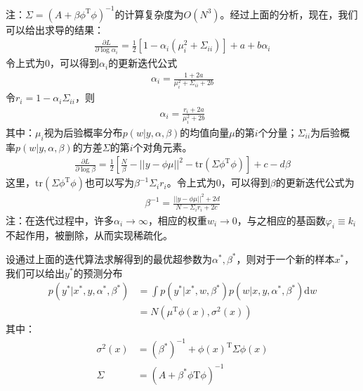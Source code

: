         注：$\Sigma = (A+\beta \phi^\mathrm{T}\phi)^{-1}$的计算复杂度为$O(N^3)$。经过上面的分析，现在，我们可以给出求导的结果：\\
        \begin{align*}
        \frac{\partial L}{\partial \log \alpha_i} = \frac{1}{2}[1-\alpha_i(\mu_i^2 + \Sigma_{ii})] + a+ b\alpha_i
        \end{align*}
        令上式为0，可以得到$\alpha_i$的更新迭代公式
        \begin{align*}
        \alpha_i = \frac{1+2a}{\mu_i^2 + \Sigma_{ii} +2b}
        \end{align*}
        令$r_i = 1-\alpha_i \Sigma_{ii}$，则
        \begin{align*}
        \alpha_i  = \frac{r_i+2a}{\mu_i^2 + 2b}
        \end{align*}
        其中：$\mu_i$视为后验概率分布$p(w|y,\alpha,\beta)$的均值向量$\mu$的第$i$个分量；$\Sigma_{ii}$为后验概率$p(w|y,\alpha,\beta)$的方差$\Sigma$的第$i$个对角元素。\\
        \begin{align*}
        \frac{\partial L}{\partial \log \beta} = \frac{1}{2}\left[ \frac{N}{\beta} - ||y-\phi\mu||^2 -\mathrm{tr}(\Sigma \phi^\mathrm{T}\phi)  \right] + c- d\beta
        \end{align*}
        这里，$\mathrm{tr}(\Sigma \phi^\mathrm{T}\phi)$也可以写为$\beta^{-1}\Sigma_ir_i$。令上式为0，可以得到$\beta$的更新迭代公式为
        \begin{align*}
        \beta^{-1} = \frac{||y-\phi\mu||^2 + 2d}{N - \Sigma_i r_i + 2c}
        \end{align*}
        注：在迭代过程中，许多$\alpha_i \rightarrow \infty$，相应的权重$w_i\rightarrow 0$，与之相应的基函数$\varphi_i \equiv k_i$不起作用，被删除，从而实现稀疏化。
        \par
        设通过上面的迭代算法求解得到的最优超参数为$\alpha^*,\beta^*$，则对于一个新的样本$x^*$，我们可以给出$y^*$的预测分布
        \begin{align*}
        p(y^*|x^*,y,\alpha^*,\beta^*) &= \int p(y^*|x^*,w,\beta^*)p(w|x,y,\alpha^*,\beta^*)\mathrm{d}w\\
        &=N(\mu^\mathrm{T}\phi(x),\sigma^2(x))
        \end{align*}
        其中：
        \begin{align*}
        \sigma^2(x) &= (\beta^*)^{-1}+\phi(x)^\mathrm{T}\Sigma \phi(x) \\
        \Sigma &= (A + \beta^*\phi\mathrm{T}\phi)^{-1}
        \end{align*}
